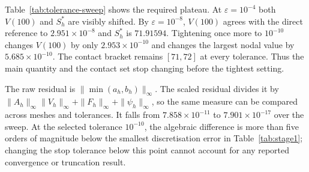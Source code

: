 \documentclass[11pt,a4paper]{article}
\theoremstyle{definition}
\theoremstyle{remark}
\begin{document}
Table~\ref{tab:tolerance-sweep} shows the required plateau. At
$\varepsilon=10^{-4}$ both $V(100)$ and $S_h^*$ are visibly shifted. By
$\varepsilon=10^{-8}$, $V(100)$ agrees with the direct reference to
$2.951\times10^{-8}$ and $S_h^*$ is $71.91594$. Tightening once more to
$10^{-10}$ changes $V(100)$ by only $2.953\times10^{-10}$ and changes the
largest nodal value by $5.685\times10^{-10}$. The contact bracket remains
$[71,72]$ at every tolerance. Thus the main quantity and the contact set stop
changing before the tightest setting.

The raw residual is $\|\min(a_h,b_h)\|_\infty$. The scaled residual divides it
by
$\|A_h\|_\infty\|V_h\|_\infty+\|F_h\|_\infty+\|\psi_h\|_\infty$,
so the same measure can be compared across meshes and tolerances. It falls
from $7.858\times10^{-11}$ to $7.901\times10^{-17}$ over the sweep. At the
selected tolerance $10^{-10}$, the algebraic difference is more than five
orders of magnitude below the smallest discretisation error in
Table~\ref{tab:stage1}; changing the stop tolerance below this point cannot
account for any reported convergence or truncation result.

\begin{table}[H]
\centering
\scriptsize
\setlength{\tabcolsep}{4pt}
\caption{PSOR tolerance sweep at $N=400$ and $S_{\max}=400$. The reference is
the direct policy-iteration solution $V_{\mathrm{ref}}(100)=12.2514098322$;
the two difference columns compare against that reference. $V(100)$ and
$S_h^*$ stop changing at the displayed precision, and the bracket remains
$[71,72]$ throughout. This matters because it identifies $10^{-10}$ as a
tolerance safely below the discretisation error, so the reported convergence
and truncation conclusions are not controlled by algebraic stopping error.}
\label{tab:tolerance-sweep}
\end{table}
\end{document}
